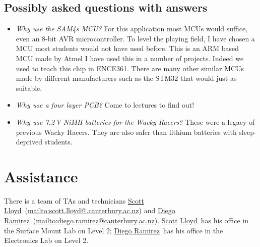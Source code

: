\documentclass[11pt, a4paper]{article}
\makeatletter
\newcommand{\scottemail}{\url{mailto:scott.lloyd@.canterbury.ac.nz}}
\newcommand{\diegoemail}{\url{mailto:diego.ramirez@canterbury.ac.nz}}
\newcommand{\scott}{\href{mailto:scott.lloyd@.canterbury.ac.nz}{Scott Lloyd}}
\newcommand{\diego}{\href{mailto:diego.ramirez@canterbury.ac.nz}{Diego Ramirez}}
\makeatother
\begin{document}
\subsection{Possibly asked questions with answers}

\begin{itemize}
\item \emph{Why use the SAM4s MCU?}  For this application most MCUs
  would suffice, even an 8-bit AVR microcontroller.  To level the
  playing field, I have chosen a MCU most students would not have used
  before.  This is an ARM based MCU made by Atmel I have used this in
  a number of projects.  Indeed we used to teach this chip in ENCE361.
  There are many other similar MCUs made by different manufacturers
  such as the STM32 that would just as suitable.

\item \emph{Why use a four layer PCB?}  Come to lectures to find out!

\item \emph{Why use 7.2\,V NiMH batteries for the Wacky Racers?}
  These were a legacy of previous Wacky Racers.  They are also safer
  than lithium batteries with sleep-deprived students.


\end{itemize}


\section{Assistance}

There is a team of TAs and technicians \scott\ (\scottemail) and
\diego\ (\diegoemail).  \scott\ has his office in the Surface Mount
Lab on Level 2; \diego\ has his office in the Electronics Lab on Level
2.
\end{document}
